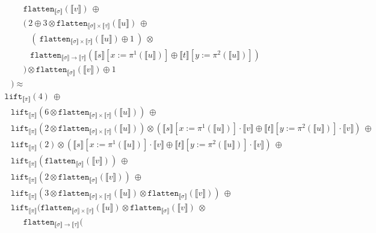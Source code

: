 \documentclass[runningheads,a4paper]{llncs}
\newcommand{\typeinterpret}[1]{\llbracket #1 \rrbracket}
\newcommand{\interpret}[1]{\llbracket #1 \rrbracket}
\newcommand{\arrtype}{\rightarrow}
\newcommand{\flatten}{\mathtt{flatten}}
\newcommand{\lift}{\mathtt{lift}}
\begin{document}
\begin{itemize}
\[\begin{array}{l}
    \phantom{ABC}\flatten_{\typeinterpret{\sigma}}(\interpret{v})\ 
      \oplus \\
    \phantom{ABC}(\ 2 \oplus 3 \otimes \flatten_{\typeinterpret{\sigma}
      \times \typeinterpret{\tau}}(\interpret{u})\ \oplus \\
    \phantom{ABCD}(\ 
    \flatten_{\typeinterpret{\sigma} \times \typeinterpret{\tau}}(
    \interpret{u}) \oplus 1\ )\ \otimes \\
    \phantom{ABCD}\flatten_{\typeinterpret{\sigma} \arrtype
      \typeinterpret{\tau}}(
      \interpret{s}[x:=\pi^1(\interpret{u})] \oplus
       \interpret{t}[y:=\pi^2(\interpret{u})]) \\
    \phantom{ABC} ) \otimes
    \flatten_{\typeinterpret{\sigma}}(\interpret{v}) \oplus 1 \\
    \phantom{A} ) \approx \\
  \lift_{\typeinterpret{\pi}}(4)\ \oplus \\
  \phantom{A}
  \lift_{\typeinterpret{\pi}}(6 \otimes
    \flatten_{\typeinterpret{\sigma} \times \typeinterpret{\tau}}(
    \interpret{u}))\ \oplus \\
  \phantom{A}
  \lift_{\typeinterpret{\pi}}(2 \otimes
    \flatten_{\typeinterpret{\sigma} \times \typeinterpret{\tau}}(
    \interpret{u})) \otimes
    (\interpret{s}[x:=\pi^1(\interpret{u})] \cdot \interpret{v} \oplus
     \interpret{t}[y:=\pi^2(\interpret{u})] \cdot \interpret{v})\ 
     \oplus \\
  \phantom{A}
  \lift_{\typeinterpret{\pi}}(2) \otimes
    (\interpret{s}[x:=\pi^1(\interpret{u})] \cdot \interpret{v} \oplus
     \interpret{t}[y:=\pi^2(\interpret{u})] \cdot \interpret{v})\ 
     \oplus \\
  \phantom{A}
  \lift_{\typeinterpret{\pi}}(\flatten_{\typeinterpret{
    \sigma}}(\interpret{v}))\ \oplus \\
  \phantom{A}
  \lift_{\typeinterpret{\pi}}(2 \otimes \flatten_{\typeinterpret{
    \sigma}}(\interpret{v}))\ \oplus \\
  \phantom{A}
  \lift_{\typeinterpret{\pi}}(3 \otimes \flatten_{\typeinterpret{
    \sigma} \times \typeinterpret{\tau}}(\interpret{u}) \otimes
    \flatten_{\typeinterpret{\sigma}}(\interpret{v}))\ \oplus \\
  \phantom{A}
  \lift_{\typeinterpret{\pi}}(\flatten_{\typeinterpret{\sigma} \times
    \typeinterpret{\tau}}(\interpret{u}) \otimes
    \flatten_{\typeinterpret{\sigma}}(\interpret{v})\ \otimes \\
  \phantom{ABC}
    \flatten_{\typeinterpret{\sigma} \arrtype \typeinterpret{\tau}}(

\end{array}\]
\end{itemize}
\end{document}
